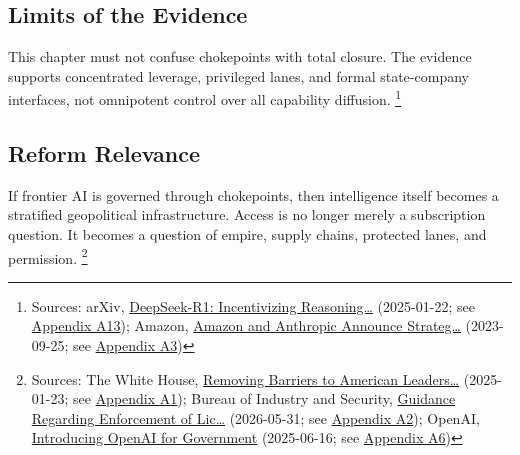 \documentclass[
  american,
  11pt,
  letterpaper,
]{article}
\begin{document}
\subsection{Limits of the Evidence}\label{limits-of-the-evidence-7}

This chapter must not confuse chokepoints with total closure. The
evidence supports concentrated leverage, privileged lanes, and formal
state-company interfaces, not omnipotent control over all capability
diffusion. \footnote{Sources: arXiv,
  \href{https://arxiv.org/abs/2501.12948}{DeepSeek-R1: Incentivizing
  Reasoning\ldots{}} (2025-01-22; see
  \hyperref[ch-07-appendix-a13-deepseek-r1-incentivizing-reasoning-capability-in-llms-via-reinforcement-learning]{Appendix
  A13}); Amazon,
  \href{https://press.aboutamazon.com/2023/9/amazon-and-anthropic-announce-strategic-collaboration-to-advance-generative-ai}{Amazon
  and Anthropic Announce Strateg\ldots{}} (2023-09-25; see
  \hyperref[ch-07-appendix-a3-amazon-and-anthropic-announce-strategic-collaboration-to-advance-generative-ai]{Appendix
  A3})}

\subsection{Reform Relevance}\label{reform-relevance-7}

If frontier AI is governed through chokepoints, then intelligence itself
becomes a stratified geopolitical infrastructure. Access is no longer
merely a subscription question. It becomes a question of empire, supply
chains, protected lanes, and permission. \footnote{Sources: The White
  House,
  \href{https://www.whitehouse.gov/presidential-actions/2025/01/removing-barriers-to-american-leadership-in-artificial-intelligence/}{Removing
  Barriers to American Leaders\ldots{}} (2025-01-23; see
  \hyperref[ch-07-appendix-a1-removing-barriers-to-american-leadership-in-artificial-intelligence]{Appendix
  A1}); Bureau of Industry and Security,
  \href{https://www.bis.gov/media/documents/bis-guidance-may-31-2026.pdf}{Guidance
  Regarding Enforcement of Lic\ldots{}} (2026-05-31; see
  \hyperref[ch-07-appendix-a2-guidance-regarding-enforcement-of-license-requirements-for-advanced-computing-items-for-entities-headquartered-in-country-group-d-5-and-macau]{Appendix
  A2}); OpenAI,
  \href{https://openai.com/global-affairs/introducing-openai-for-government/}{Introducing
  OpenAI for Government} (2025-06-16; see
  \hyperref[ch-07-appendix-a6-introducing-openai-for-government]{Appendix
  A6})}
\end{document}
